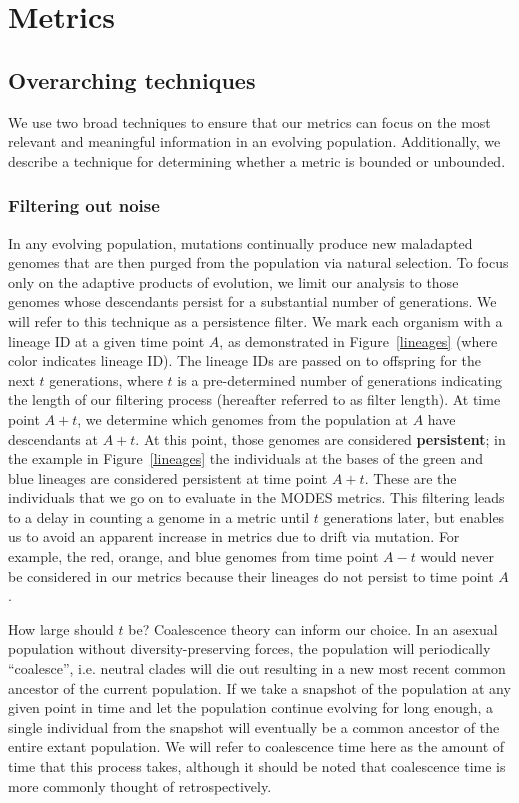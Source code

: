 \documentclass[letterpaper]{article}
\begin{document}
\section{Metrics}



\subsection{Overarching techniques}

We use two broad techniques to ensure that our metrics can focus on the most relevant and meaningful information in an evolving population. Additionally, we describe a technique for determining whether a metric is bounded or unbounded.

\subsubsection{Filtering out noise}

In any evolving population, mutations continually produce new maladapted genomes that are then purged from the population via natural selection. To focus only on the adaptive products of evolution, we limit our analysis to those genomes whose descendants persist for a substantial number of generations. We will refer to this technique as a persistence filter. We mark each organism with a lineage ID at a given time point $A$, as demonstrated in Figure~\ref{lineages} (where color indicates lineage ID). The lineage IDs are passed on to offspring for the next $t$ generations, where $t$ is a pre-determined number of generations indicating the length of our filtering process (hereafter referred to as filter length). At time point $A+t$, we determine which genomes from the population at $A$ have descendants at $A+t$. At this point, those genomes are considered \textbf{persistent}; in the example in Figure~\ref{lineages} the individuals at the bases of the green and blue lineages are considered persistent at time point $A+t$. These are the individuals that we go on to evaluate in the MODES metrics. This filtering leads to a delay in counting a genome in a metric until $t$ generations later, but enables us to avoid an apparent increase in metrics due to drift via mutation. For example, the red, orange, and blue genomes from time point $A-t$ would never be considered in our metrics because their lineages do not persist to time point $A$.
    
How large should $t$ be? Coalescence theory can inform our choice. In an asexual population without diversity-preserving forces, the population will periodically ``coalesce'', i.e. neutral clades will die out resulting in a new most recent common ancestor of the current population. If we take a snapshot of the population at any given point in time and let the population continue evolving for long enough,  a single individual from the snapshot will eventually be a common ancestor of the entire extant population. We will refer to coalescence time here as the amount of time that this process takes, although it should be noted that coalescence time is more commonly thought of retrospectively. 
\end{document}
